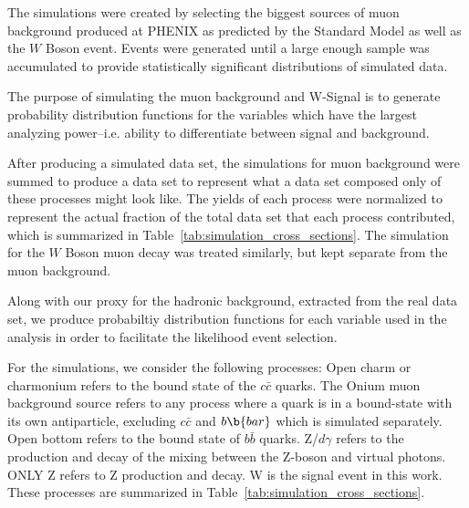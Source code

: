 The simulations were created by selecting the biggest sources of muon background
produced at PHENIX as predicted by the Standard Model as well as the $W$ Boson
event. Events were generated until a large enough sample was accumulated to
provide statistically significant distributions of simulated data.

The purpose of simulating the muon background and W-Signal is to generate
probability distribution functions for the variables which have the largest
analyzing power--i.e. ability to differentiate between signal and background.

After producing a simulated data set, the simulations for muon background were
summed to produce a data set to represent what a data set composed only of these
processes might look like. The yields of each process were normalized to
represent the actual fraction of the total data set that each process
contributed, which is summarized in Table~\ref{tab:simulation_cross_sections}.
The simulation for the $W$ Boson muon decay was treated similarly, but kept
separate from the muon background.

Along with our proxy for the hadronic background, extracted from the real data
set, we produce probabiltiy distribution functions for each variable used in the
analysis in order to facilitate the likelihood event selection.

For the simulations, we consider the following processes: Open charm or
charmonium refers to the bound state of the $c\bar{c}$ quarks. The Onium muon
background source refers to any process where a quark is in a bound-state with
its own antiparticle, excluding $c\bar{c}$ and $b\b{bar}$ which is simulated
separately. Open bottom refers to the bound state of $b\bar{b}$ quarks.
Z/$d\gamma$ refers to the production and decay of the mixing between the Z-boson
and virtual photons. ONLY Z refers to Z production and decay.  W is the signal
event in this work.  These processes are summarized in
Table~\ref{tab:simulation_cross_sections}.  


